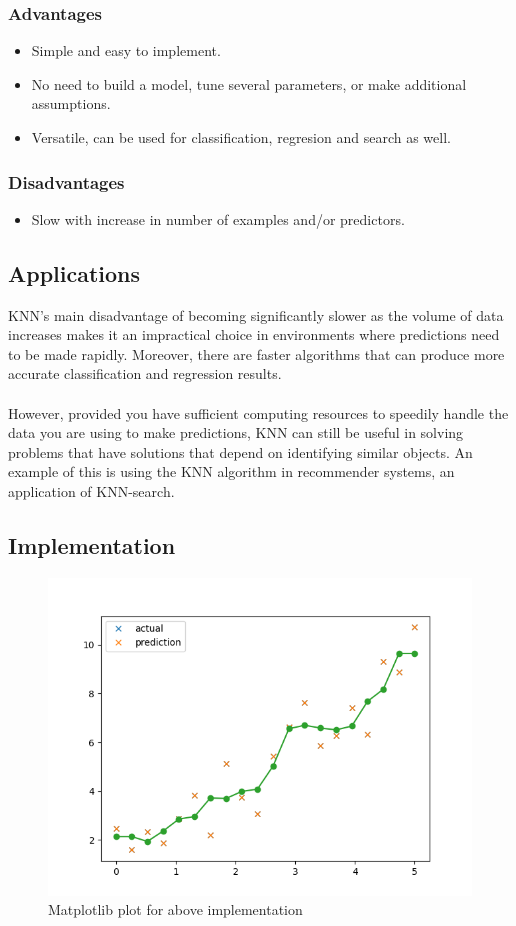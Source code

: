 \documentclass[12pt, A4]{report}
\begin{document}
	\subsubsection*{Advantages}
	\begin{itemize}
		\item Simple and easy to implement.
		\item No need to build a model, tune several parameters, or make additional assumptions.
		\item Versatile, can be used for classification, regresion and search as well.
	\end{itemize}

	\subsubsection*{Disadvantages}
	\begin{itemize}
		\item Slow with increase in number of examples and/or predictors.
	\end{itemize}
	
\subsection*{Applications}
	KNN’s main disadvantage of becoming significantly slower as the volume of data increases makes it an impractical choice in environments where predictions need to be made rapidly. Moreover, there are faster algorithms that can produce more accurate classification and regression results.\\ \\
	However, provided you have sufficient computing resources to speedily handle the data you are using to make predictions, KNN can still be useful in solving problems that have solutions that depend on identifying similar objects. An example of this is using the KNN algorithm in recommender systems, an application of KNN-search.

\subsection*{Implementation}


\begin{figure}[h]
	\centering
	\includegraphics[scale=0.8]{kNNplot.png}
	\caption{Matplotlib plot for above implementation}
\end{figure}
\end{document}
